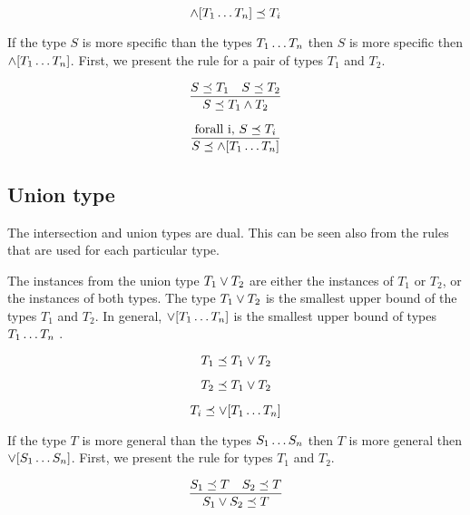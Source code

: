 \documentclass[runningheads]{llncs}
\begin{document}
\begin{equation}
\land[T_1\ldots\/T_n] \preceq\/T_i  
\end{equation}

If the type $S$ is more specific than the types $T_1\ldots\/T_n$ then
$S$ is more specific then $\land[T_1\ldots\/T_n]$. First, we present
the rule for a pair of types $T_1$ and $T_2$.

\begin{equation}
\dfrac{S\preceq\/T_1\quad\/S\preceq\/\/T_2}
      {S\preceq\/T_1\land\/T_2}  
\end{equation}

\begin{equation}
\label{rul:intsc-gather}
\dfrac{\text{forall i,\ } S\preceq\/T_i}
      {S\preceq\land[T_1\ldots\/T_n]}  
\end{equation}

\subsection{Union type}

The intersection and union types are dual. This can be seen also from
the rules that are used for each particular type.

The instances from the union type $T_1\lor\/T_2$ are either the
instances of $T_1$ or $T_2$, or the instances of both types. The type
$T_1\lor\/T_2$ is the smallest upper bound of the types $T_1$ and
$T_2$. In general, $\lor[T_1\ldots\/T_n]$ is the smallest upper bound
of types $T_1\ldots\/T_n$ \cite{Pierce90CalculusIntersectUnion}.

\begin{equation}
T_1\preceq\/T_1\lor\/T_2    
\end{equation}

\begin{equation}
T_2\preceq\/T_1\lor\/T_2  
\end{equation}

\begin{equation}
T_i\preceq\/\lor[T_1\ldots\/T_n]  
\end{equation}

If the type $T$ is more general than the types $S_1\ldots\/S_n$ then
$T$ is more general then $\lor[S_1\ldots\/S_n]$. First, we present
the rule for types $T_1$ and $T_2$.

\begin{equation}
\dfrac{S_1\preceq\/T\quad\/S_2\preceq\/\/T}
      {S_1\lor\/S_2\preceq\/T}  
\end{equation}
\end{document}
